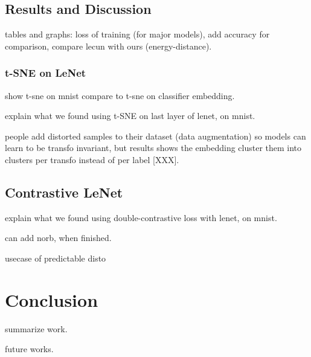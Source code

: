\documentclass[a4paper,12pt]{report}
\begin{document}
\section{Results and Discussion}

tables and graphs: loss of training (for major models), add accuracy for comparison, compare lecun with ours (energy-distance).

\subsection{t-SNE on LeNet}
show t-sne on mnist
compare to t-sne on classifier embedding.

explain what we found using t-SNE on last layer of lenet, on mnist.

people add distorted samples to their dataset (data augmentation) so models can learn to be transfo invariant, but results shows the embedding cluster them into clusters per transfo instead of per label [XXX].

\section{Contrastive LeNet}
explain what we found using double-contrastive loss with lenet, on mnist.

can add norb, when finished.

usecase of predictable disto


\chapter{Conclusion}

summarize work.

future works.

{}


\nocite{lecun2004learning}
\end{document}
